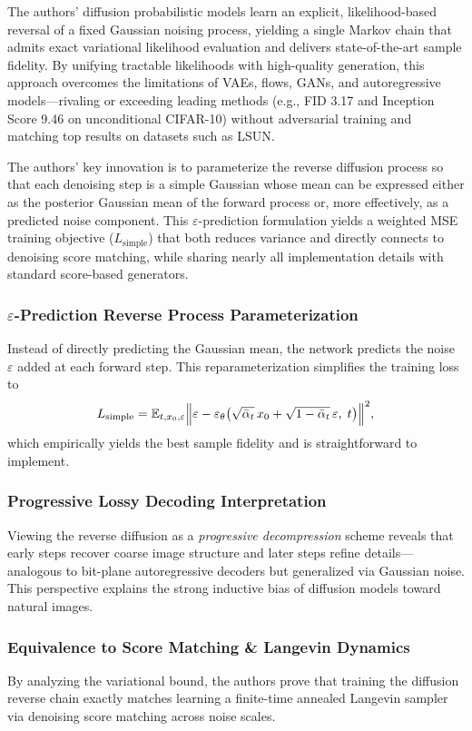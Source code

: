 \documentclass[10pt]{article}
\begin{document}
The authors' diffusion probabilistic models learn an explicit, likelihood-based reversal of a fixed Gaussian noising process, yielding a single Markov chain that admits exact variational likelihood evaluation and delivers state-of-the-art sample fidelity. By unifying tractable likelihoods with high-quality generation, this approach overcomes the limitations of VAEs, flows, GANs, and autoregressive models—rivaling or exceeding leading methods (e.g., FID 3.17 and Inception Score 9.46 on unconditional CIFAR-10) without adversarial training and matching top results on datasets such as LSUN.

The authors' key innovation is to parameterize the reverse diffusion process so that each denoising step is a simple Gaussian whose mean can be expressed either as the posterior Gaussian mean of the forward process or, more effectively, as a predicted noise component. This \(\varepsilon\)-prediction formulation yields a weighted MSE training objective (\(L_{\mathrm{simple}}\)) that both reduces variance and directly connects to denoising score matching, while sharing nearly all implementation details with standard score-based generators.

\subsubsection*{\(\varepsilon\)-Prediction Reverse Process Parameterization}
Instead of directly predicting the Gaussian mean, the network predicts the noise \(\varepsilon\) added at each forward step. This reparameterization simplifies the training loss to
\[
    L_{\mathrm{simple}} = \mathbb{E}_{t,x_0,\varepsilon}\Bigl\|\varepsilon - \varepsilon_\theta\bigl(\sqrt{\bar\alpha_t}\,x_0 + \sqrt{1-\bar\alpha_t}\,\varepsilon,\;t\bigr)\Bigr\|^2,
\]
which empirically yields the best sample fidelity and is straightforward to implement.

\subsubsection*{Progressive Lossy Decoding Interpretation}
Viewing the reverse diffusion as a \emph{progressive decompression} scheme reveals that early steps recover coarse image structure and later steps refine details—analogous to bit-plane autoregressive decoders but generalized via Gaussian noise. This perspective explains the strong inductive bias of diffusion models toward natural images.

\subsubsection*{Equivalence to Score Matching \& Langevin Dynamics}
By analyzing the variational bound, the authors prove that training the diffusion reverse chain exactly matches learning a finite-time annealed Langevin sampler via denoising score matching across noise scales.
\end{document}
